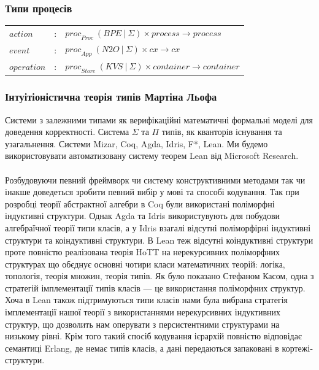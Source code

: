 \documentclass[11pt,oneside]{article}
\begin{document}
  \subsubsection*{Типи процесів}

\begin{center}
\begin{tabular}{lll}
         $action$ &:& ${proc}_{Proc}\  (BPE\ |\ \Sigma) \times process \rightarrow process$ \\
          $event$ &:& ${proc}_{App}\   (N2O\ |\ \Sigma) \times cx \rightarrow cx$ \\
      $operation$ &:& ${proc}_{Store}\ (KVS\ |\ \Sigma) \times container \rightarrow container$ \\
\end{tabular}
\end{center}

\newpage
   \subsubsection{Інтуітіоністична теорія типів Мартіна Льофа}
   Системи з залежними типами як верифікаційні математичні формальні моделі
   для доведення корректності. Система $\Sigma$ та $\Pi$ типів, як кванторів
   існування та узагальнення. Системи Mizar, Coq, Agda, Idris, F*, Lean. Ми будемо
   використовувати автоматизовану систему теорем Lean від Microsoft Research.
   \paragraph{}
   Розбудовуючи певний фреймворк чи систему конструктивними методами
   так чи інакше доведеться зробити певний вибір у мові та способі кодування.
   Так при розробці теорії абстрактної алгебри в Coq були використані
   поліморфні індуктивні структури\cite{coqalg}. Однак Agda та Idris використувують
   для побудови алгебраїчної теорії типи класів, а у Idris взагалі відсутні
   поліморфірні індуктивні структури та коіндуктивні структури. В Lean
   теж відсутні коіндуктивні структури проте повністю реалізована теорія
   HoTT на нерекурсивних поліморфних структурах що обєднує основні чотири
   класи математичних теорій: логіка, топологія, теорія множин, теорія типів.
   Як було показано Стефаном Касом\cite{kaes}, одна з
   стратегій імплементації типів класів --- це використання поліморфних структур.
   Хоча в Lean також підтримуються типи класів нами була вибрана стратегія
   імплементації нашої теорії з використаннями нерекурсивних індуктивних структур,
   що дозволить нам оперувати з персистентними структурами на низькому рівні.
   Крім того такий спосіб кодування ієрархій повністю відповідає семантиці Erlang,
   де немає типів класів, а дані передаються запаковані в кортежі-структури.
\end{document}
